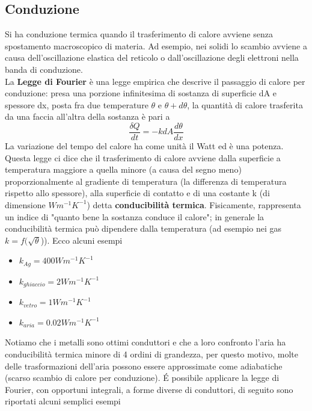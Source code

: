 \documentclass[10pt,a4paper]{article}
\begin{document}
\subsection{Conduzione}
Si ha conduzione termica quando il trasferimento di calore avviene senza spostamento macroscopico di materia. Ad esempio, nei solidi lo scambio avviene a causa dell'oscillazione elastica del reticolo o dall'oscillazione degli elettroni nella banda di conduzione. \\
La \textbf{Legge di Fourier} è una legge empirica che descrive il passaggio di calore per conduzione: presa una porzione infinitesima di sostanza di superficie dA e spessore dx, posta fra due temperature $\theta$ e $\theta+d\theta$, la quantità di calore trasferita da una faccia all'altra della sostanza è pari a 
\[\frac{\delta Q}{dt}= - k dA \frac{d\theta}{dx}\]
La variazione del tempo del calore ha come unità il Watt ed è una potenza. Questa legge ci dice che il trasferimento di calore avviene dalla superficie a temperatura maggiore a quella minore (a causa del segno meno) proporzionalmente al gradiente di temperatura (la differenza di temperatura rispetto allo spessore), alla superficie di contatto e di una costante k (di dimensione \(W m^{-1} K^{-1}\)) detta \textbf{conducibilità termica}. Fisicamente, rappresenta un indice di "quanto bene la sostanza conduce il calore";  in generale la conducibilità termica può dipendere dalla temperatura (ad esempio nei gas $k = f(\sqrt{\theta}$)). Ecco alcuni esempi
\begin{itemize}
	\item $k_{Ag} = 400 W m^{-1} K^{-1}$
	\item $k_{ghiaccio} = 2 W m^{-1} K^{-1}$
	\item $k_{vetro} = 1 W m^{-1} K^{-1}$
	\item $k_{aria} = 0.02 W m^{-1} K^{-1}$
\end{itemize} 
Notiamo che i metalli sono ottimi conduttori e che a loro confronto l'aria ha conducibilità termica minore di 4 ordini di grandezza, per questo motivo, molte delle trasformazioni dell'aria possono essere approssimate come adiabatiche (scarso scambio di calore per conduzione). \'{E} possibile applicare la legge di Fourier, con opportuni integrali, a forme diverse di conduttori, di seguito sono riportati alcuni semplici esempi
\end{document}
